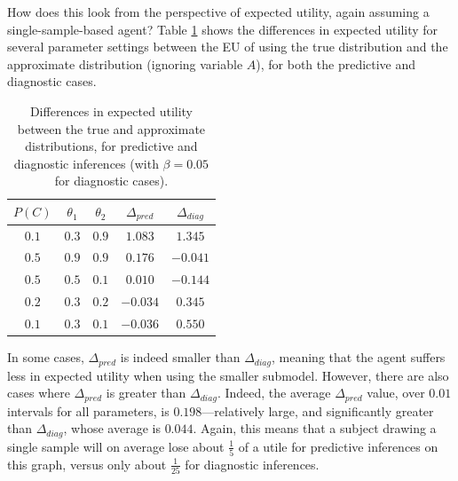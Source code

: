 \documentclass[10pt,letterpaper]{article}
\begin{document}
How does this look from the perspective of expected utility, again assuming a single-sample-based agent?  Table \ref{predictive} shows the differences in expected utility for several parameter settings between the EU of using the true distribution and the approximate distribution (ignoring variable $A$), for both the predictive and diagnostic cases. 
\begin{table}[h]  \begin{center}
\begin{tabular}{c | c | c || c | c}
 $P(C)$ & $\theta_1$ & $\theta_2$ & $\Delta_{pred}$ & $\Delta_{diag}$ \\ \hline
  $0.1$ & $0.3$ & $0.9$ & $1.083$ & $1.345$ \\
 $0.5$ & $0.9$ &  $0.9$ & $0.176$ & $-0.041$ \\
 $0.5$ & $0.5$ & $0.1$ & $0.010$ & $-0.144$ \\
  $0.2$ & $0.3$ & $0.2$ & $-0.034$ & $0.345$ \\
 $0.1$ & $0.3$ & $0.1$ & $-0.036$ & $0.550$ \\

\end{tabular} \end{center} \caption{Differences in expected utility between the true and approximate distributions, for predictive and diagnostic inferences (with $\beta = 0.05$ for diagnostic cases).} \label{predictive}
\end{table} 
In some cases, $\Delta_{pred}$ is indeed smaller than $\Delta_{diag}$, meaning that the agent suffers less in expected utility when using the smaller submodel. However, there are also cases where $\Delta_{pred}$ is greater than $\Delta_{diag}$. Indeed, the average $\Delta_{pred}$ value, over $0.01$ intervals for all parameters, is $0.198$---relatively large, and significantly greater than $\Delta_{diag}$, whose average is $0.044$. Again, this means that a subject drawing a single sample will on average lose about $\frac{1}{5}$ of a utile for predictive inferences on this graph, versus only about $\frac{1}{25}$ for diagnostic inferences.
\end{document}
